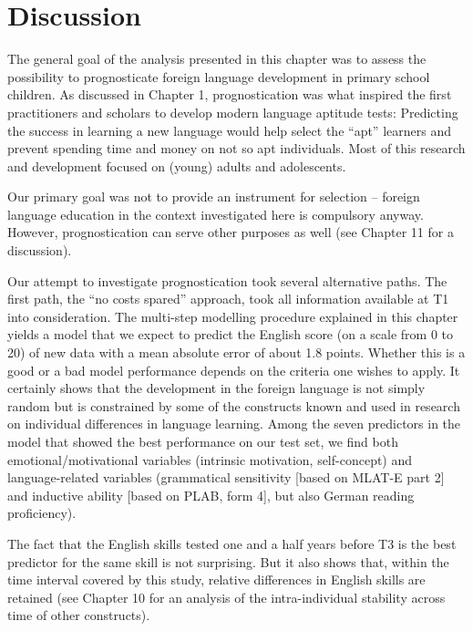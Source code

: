 \documentclass[output=paper]{langsci/langscibook}
\begin{document}
\section{Discussion}

The general goal of the analysis presented in this chapter was to assess the possibility to prognosticate foreign language development in primary school children. As discussed in Chapter 1, prognostication was what inspired the first practitioners and scholars to develop modern language aptitude tests: Predicting the success in learning a new language would help select the ``apt'' learners and prevent spending time and money on not so apt individuals. Most of this research and development focused on (young) adults and adolescents.

Our primary goal was not to provide an instrument for selection –  foreign language education in the context investigated here is compulsory anyway. However, prognostication can serve other purposes as well (see Chapter 11 for a discussion).

Our attempt to investigate prognostication took several alternative paths. The first path, the ``no costs spared'' approach, took all information available at T1 into consideration. The multi-step modelling procedure explained in this chapter yields a model that we expect to predict the English score (on a scale from 0 to 20) of new data with a mean absolute error of about 1.8 points. Whether this is a good or a bad model performance depends on the criteria one wishes to apply. It certainly shows that the development in the foreign language is not simply random but is constrained by some of the constructs known and used in research on individual differences in language learning. Among the seven predictors in the model that showed the best performance on our test set, we find both emotional\slash motivational variables (intrinsic motivation, self-concept) and language-related variables (grammatical sensitivity [based on MLAT-E part 2] and inductive ability [based on PLAB, form 4], but also German reading proficiency). 

The fact that the English skills tested one and a half years before T3 is the best predictor for the same skill is not surprising. But it also shows that, within the time interval covered by this study, relative differences in English skills are retained (see Chapter 10 for an analysis of the intra-individual stability across time of other constructs). 
\end{document}
